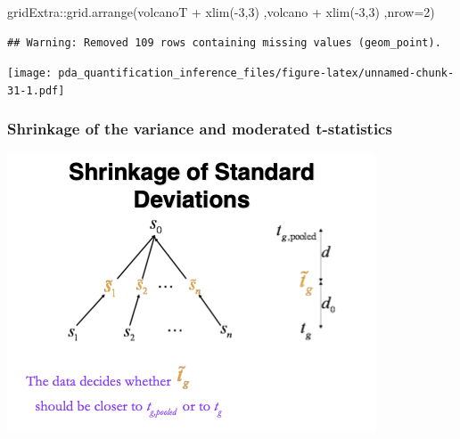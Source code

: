 \documentclass[
]{article}
\newenvironment{Shaded}{\begin{snugshade}}{\end{snugshade}}
\newcommand{\AttributeTok}[1]{\textcolor[rgb]{0.77,0.63,0.00}{#1}}
\newcommand{\DecValTok}[1]{\textcolor[rgb]{0.00,0.00,0.81}{#1}}
\newcommand{\FunctionTok}[1]{\textcolor[rgb]{0.00,0.00,0.00}{#1}}
\newcommand{\NormalTok}[1]{#1}
\newcommand{\SpecialCharTok}[1]{\textcolor[rgb]{0.00,0.00,0.00}{#1}}
\newcommand{\StringTok}[1]{\textcolor[rgb]{0.31,0.60,0.02}{#1}}
\begin{document}
\begin{Shaded}
\begin{Highlighting}[]
\NormalTok{gridExtra}\SpecialCharTok{::}\FunctionTok{grid.arrange}\NormalTok{(volcanoT }\SpecialCharTok{+}    \FunctionTok{xlim}\NormalTok{(}\SpecialCharTok{{-}}\DecValTok{3}\NormalTok{,}\DecValTok{3}\NormalTok{)}
\NormalTok{,volcano }\SpecialCharTok{+}     \FunctionTok{xlim}\NormalTok{(}\SpecialCharTok{{-}}\DecValTok{3}\NormalTok{,}\DecValTok{3}\NormalTok{)}
\NormalTok{,}\AttributeTok{nrow=}\DecValTok{2}\NormalTok{)}
\end{Highlighting}
\end{Shaded}

\begin{verbatim}
## Warning: Removed 109 rows containing missing values (geom_point).
\end{verbatim}

\texttt{[image: pda\_quantification\_inference\_files/figure-latex/unnamed-chunk-31-1.pdf]}

\hypertarget{shrinkage-of-the-variance-and-moderated-t-statistics}{%
\subsubsection{Shrinkage of the variance and moderated
t-statistics}\label{shrinkage-of-the-variance-and-moderated-t-statistics}}

\includegraphics{./figures/limmaShrinkage.png}

\begin{Shaded}
\end{Shaded}
\end{document}
